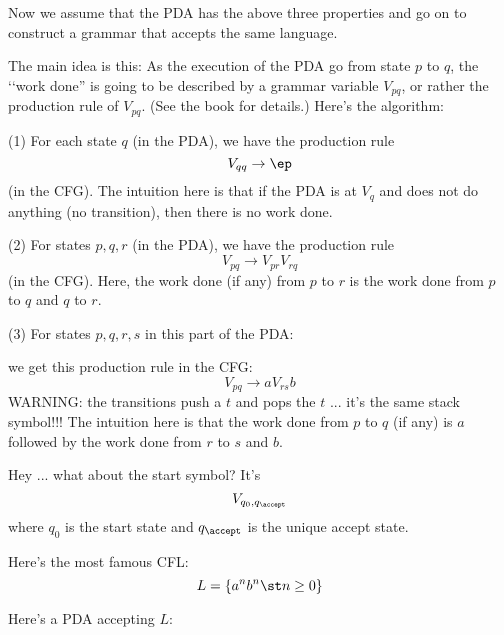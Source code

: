 Now we assume that the PDA has the above three properties and go on
to construct a grammar that accepts the same language.

The main idea is this:
As the execution of the PDA go from state $p$ to $q$, 
the \lq\lq work done'' is going to be 
described by a grammar variable $V_{pq}$, or rather
the production rule of $V_{pq}$.
(See the book for details.)
Here's the algorithm:
\begin{mylist}
\item[(1)] For each state $q$ (in the PDA), we have the production rule
\[
V_{qq} \rightarrow \ep
\]
(in the CFG).
The intuition here is that if the PDA is at $V_{q}$ and does not
do anything (no transition), then there is no work done. 
\item[(2)] For states $p, q, r$ (in the PDA), we have the production rule
\[
V_{pq} \rightarrow V_{pr} V_{rq}
\]
(in the CFG).
Here, the work done (if any) from $p$ to $r$ is the
work done from $p$ to $q$ and $q$ to $r$.
\item[(3)] For states $p, q, r, s$ in this part of the PDA:

\begin{center}
\end{center}
we get this production rule in the CFG:
\[
V_{pq} \rightarrow a V_{rs} b
\]  
WARNING: the transitions push a $t$ and pops the $t$ ... it's the same
stack symbol!!!
The intuition here is that the work done from $p$ to $q$ (if any)
is $a$ followed by the work done from $r$ to $s$ and $b$.
\end{mylist}
Hey ... what about the start symbol?
It's
\[
V_{q_0, q_\accept}
\]
where $q_0$ is the start state and $q_\accept$ is the unique accept state.

\begin{eg}
Here's the most famous CFL:
\[
L = \{ a^n b^n \st n \geq 0 \}
\]
\end{eg}
Here's a PDA accepting $L$:
\begin{center}
\end{center}


